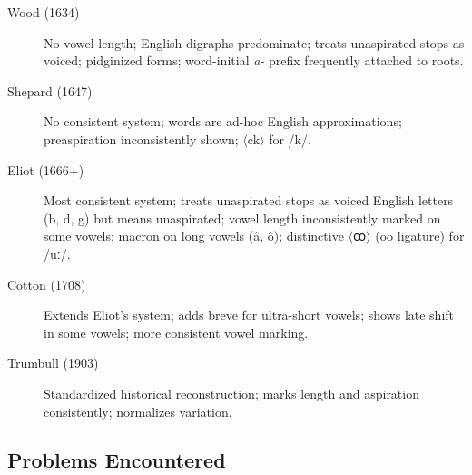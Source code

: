 \begin{description}
  \item[Wood (1634)] No vowel length; English digraphs predominate; treats
    unaspirated stops as voiced; pidginized forms; word-initial \emph{a-}
    prefix frequently attached to roots.
  \item[Shepard (1647)] No consistent system; words are ad-hoc English
    approximations; preaspiration inconsistently shown; $\langle$ck$\rangle$
    for /k/.
  \item[Eliot (1666+)] Most consistent system; treats unaspirated stops as
    voiced English letters (b, d, g) but means unaspirated; vowel length
    inconsistently marked on some vowels; macron on long vowels (â, ô);
    distinctive $\langle$ꝏ$\rangle$ (oo ligature) for /uː/.
  \item[Cotton (1708)] Extends Eliot's system; adds breve for ultra-short
    vowels; shows late shift in some vowels; more consistent vowel marking.
  \item[Trumbull (1903)] Standardized historical reconstruction; marks length
    and aspiration consistently; normalizes variation.
\end{description}

\subsection{Problems Encountered}

